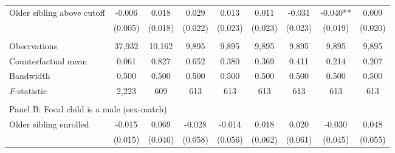 \begin{table}[!htbp]
{{\begin{tabular}{lcccccccc}
Older sibling above cutoff&      -0.006   &       0.018   &       0.029   &       0.013   &       0.011   &      -0.031   &      -0.040** &       0.009   \\
                    &     (0.005)   &     (0.018)   &     (0.022)   &     (0.023)   &     (0.023)   &     (0.023)   &     (0.019)   &     (0.020)   \\
                    &               &               &               &               &               &               &               &               \\
Observations        &      37,932   &      10,162   &       9,895   &       9,895   &       9,895   &       9,895   &       9,895   &       9,895   \\
Counterfactual mean &       0.061   &       0.827   &       0.652   &       0.380   &       0.369   &       0.411   &       0.214   &       0.207   \\
Bandwidth           &       0.500   &       0.500   &       0.500   &       0.500   &       0.500   &       0.500   &       0.500   &       0.500   \\
\textit{F}-statistic&       2,223   &         609   &         613   &         613   &         613   &         613   &         613   &         613   \\
 
&  &  &  & & & & & \\
\multicolumn{10}{l}{Panel B: Focal child is a male (sex-match)} \\
Older sibling enrolled&      -0.015   &       0.069   &      -0.028   &      -0.014   &       0.018   &       0.020   &      -0.030   &       0.048   \\
                    &     (0.015)   &     (0.046)   &     (0.058)   &     (0.056)   &     (0.062)   &     (0.061)   &     (0.045)   &     (0.055)   \\
 

\end{tabular}}}
\end{table}
